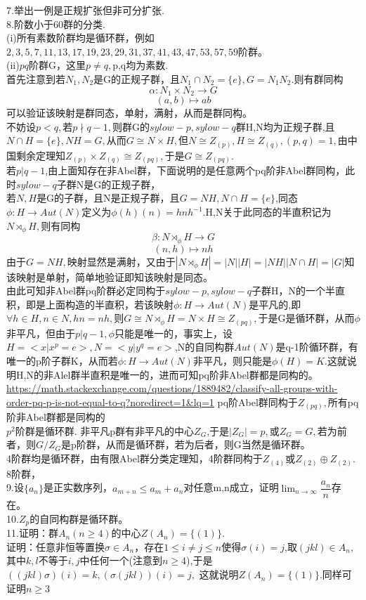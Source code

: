 \documentclass[UTF8]{article}
\begin{document}
	7.举出一例是正规扩张但非可分扩张.\\
    8.阶数小于60群的分类.\\
    (i)所有素数阶群均是循环群，例如$2,3,5,7,11,13,17,19,23,29,31,37,41,43,47,53,57,59$阶群。\\
    (ii)$pq$阶群G，这里$p\neq q,$p,q均为素数.\\
    首先注意到若$N_{1},N_{2}$是G的正规子群，且$N_{1}\cap N_{2}=\{e\},G=N_{1}N_{2}.$则有群同构$$
    \alpha :N_{1}\times N_{2}\rightarrow G
    $$
     $$
     (a,b)\mapsto ab
     $$
    可以验证该映射是群同态，单射，满射，从而是群同构。\\
    不妨设$p<q,$若$p\nmid q-1,$则群G的$sylow-p,sylow-q$群H,N均为正规子群,且$N\cap H=\{e\},NH=G,$从而$G\cong N\times H,$但$N\cong Z_{(p)},H\cong Z_{(q)},(p,q)=1,$由中国剩余定理知$Z_{(p)}\times Z_{(q)}\cong Z_{(pq)},$于是$G\cong Z_{(pq)}.$\\
    若$p|q-1$,由上面知存在非Abel群，下面说明的是任意两个pq阶非Abel群同构，此时$sylow-q$子群N是G的正规子群，\\
    若$N,H$是G的子群，且N是正规子群，且$G=NH,N\cap H=\{e\}$,同态$\phi :H\rightarrow Aut(N)$定义为$\phi(h)(n)=hnh^{-1}.$H,N关于此同态的半直积记为$N\rtimes_{\phi}H,$则有同构$$
    \beta :N\rtimes_{\phi}H\rightarrow G
    $$
    $$
    (n,h)\mapsto nh
    $$
    由于$G=NH,$映射显然是满射，又由于$|N\rtimes_{\phi}H|=|N||H|=|NH||N\cap H|=|G|$知该映射是单射，简单地验证即知该映射是同态。\\
    由此可知非Abel群pq阶群必定同构于$sylow-p,sylow-q$子群H，N的一个半直积，即是上面构造的半直积，若该映射$\phi :H\rightarrow Aut(N)$是平凡的,即$\forall h\in H,n\in N,hn=nh,$则$G\cong N\rtimes_{\phi}H=N\times H\cong Z_{(pq)},$于是G是循环群，从而$\phi$非平凡，但由于$p|q-1,\phi$只能是唯一的，事实上，设$H=<x|x^{p}=e>,N=<y|y^{q}=e>$,N的自同构群$Aut(N)$是q-1阶循环群，有唯一的p阶子群K，从而若$\phi :H\rightarrow Aut(N)$非平凡，则只能是$\phi(H)=K.$这就说明H,N的非Alel群半直积是唯一的，进而可知pq阶非Abel群都是同构的。\\
   \url{https://math.stackexchange.com/questions/1889482/classify-all-groups-with-order-pq-p-is-not-equal-to-q?noredirect=1&lq=1}
   pq阶Abel群同构于$Z_{(pq)},$所有pq阶非Abel群都是同构的\\
   $p^{2}$阶群是循环群.
   非平凡p群有非平凡的中心$Z_G$,于是$|Z_G|=p,$或$Z_{G}=G,$若为前者，则$G/Z_G$是p阶群，从而是循环群，若为后者，则G当然是循环群。\\
   4阶群均是循环群，由有限Abel群分类定理知，4阶群同构于$Z_{(4)}$或$Z_{(2)}\oplus Z_{(2)}$.\\
   8阶群，\\
   9.设$\{a_{n}\}$是正实数序列，$a_{m+n}\leq a_{m}+a_{n}$对任意m,n成立，证明$\lim_{n\rightarrow\infty}\dfrac{a_n}{n}$存在。\\
   10.$Z_{p}$的自同构群是循环群。\\
   11.证明：群$A_{n}(n\geq 4)$的中心$Z(A_{n})=\{(1)\}.$\\
   证明：任意非恒等置换$\sigma\in A_{n}$，存在$1\leq i\neq j\leq n$使得$\sigma(i)=j$,取$(jkl)\in A_{n},$其中$k,l$不等于$i,j$中任何一个(注意到$n\geq 4$),于是$((jkl)\sigma)(i)=k,(\sigma(jkl))(i)=j,$
   这就说明$Z(A_{n})=\{(1)\}.$同样可证明$n\geq 3$\\
   
\end{document}
